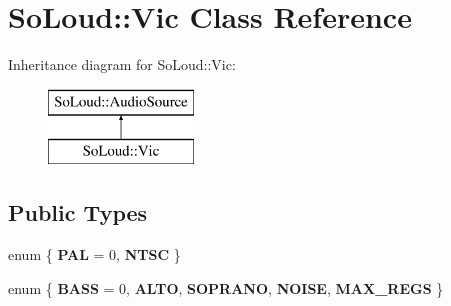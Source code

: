 \hypertarget{class_so_loud_1_1_vic}{}\section{So\+Loud\+:\+:Vic Class Reference}
\label{class_so_loud_1_1_vic}
Inheritance diagram for So\+Loud\+:\+:Vic\+:\begin{figure}[H]
\begin{center}
\leavevmode
\includegraphics[height=2.000000cm]{class_so_loud_1_1_vic}
\end{center}
\end{figure}
\subsection*{Public Types}
\begin{DoxyCompactItemize}
\item 
\mbox{\label{class_so_loud_1_1_vic_aba94fe4e42ee14965eaaf9d40c7e503a}} 
enum \{ {\bfseries P\+AL} = 0, 
{\bfseries N\+T\+SC}
 \}
\item 
\mbox{\label{class_so_loud_1_1_vic_a519909c29a5e3fefca3aad5c1c11f1e6}} 
enum \{ \newline
{\bfseries B\+A\+SS} = 0, 
{\bfseries A\+L\+TO}, 
{\bfseries S\+O\+P\+R\+A\+NO}, 
{\bfseries N\+O\+I\+SE}, 
\newline
{\bfseries M\+A\+X\+\_\+\+R\+E\+GS}
 \}
\end{DoxyCompactItemize}

